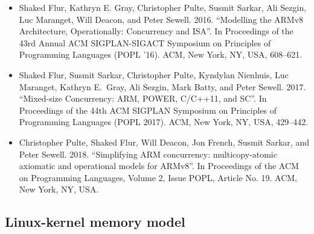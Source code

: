 \begin{itemize}
\item	Shaked Flur, Kathryn E. Gray, Christopher Pulte, Susmit
	Sarkar, Ali Sezgin, Luc Maranget, Will Deacon, and Peter
	Sewell. 2016. ``Modelling the ARMv8 Architecture, Operationally:
	Concurrency and ISA''. In Proceedings of the 43rd Annual ACM
	SIGPLAN-SIGACT Symposium on Principles of Programming Languages
	(POPL ’16). ACM, New York, NY, USA, 608--621.

\item	Shaked Flur, Susmit Sarkar, Christopher Pulte, Kyndylan Nienhuis,
	Luc Maranget, Kathryn E.~Gray, Ali Sezgin, Mark Batty, and Peter
	Sewell. 2017. ``Mixed-size Concurrency: ARM, POWER, C/C++11,
	and SC''. In Proceedings of the 44th ACM SIGPLAN Symposium on
	Principles of Programming Languages (POPL 2017). ACM, New York,
	NY, USA, 429--442.

\item	Christopher Pulte, Shaked Flur, Will Deacon, Jon French,
	Susmit Sarkar, and Peter Sewell. 2018. ``Simplifying ARM concurrency:
	multicopy-atomic axiomatic and operational models for ARMv8''. In
	Proceedings of the ACM on Programming Languages, Volume 2, Issue
	POPL, Article No. 19. ACM, New York, NY, USA.
\end{itemize}

\subsection{Linux-kernel memory model}


